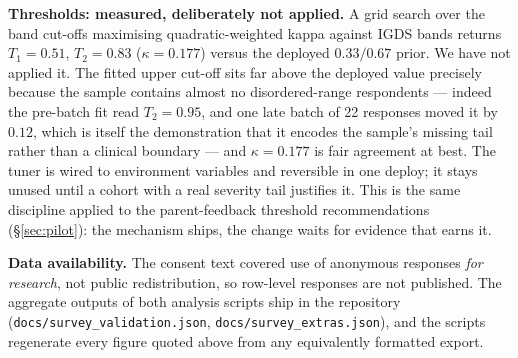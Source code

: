 \documentclass[11pt,a4paper]{article}
\begin{document}
\textbf{Thresholds: measured, deliberately not applied.} A grid search over the
band cut-offs maximising quadratic-weighted kappa against IGDS bands returns
$T_1{=}0.51$, $T_2{=}0.83$ ($\kappa = 0.177$) versus the deployed
$0.33 / 0.67$ prior. We have not applied it. The fitted upper cut-off sits far
above the deployed value precisely because the sample contains almost no
disordered-range respondents --- indeed the pre-batch fit read $T_2{=}0.95$,
and one late batch of 22 responses moved it by $0.12$, which is itself the
demonstration that it encodes the sample's missing tail rather than a
clinical boundary --- and $\kappa = 0.177$ is fair agreement at best. The tuner is wired to environment variables and reversible in one
deploy; it stays unused until a cohort with a real severity tail justifies it.
This is the same discipline applied to the parent-feedback threshold
recommendations (\S\ref{sec:pilot}): the mechanism ships, the change waits for
evidence that earns it.

\textbf{Data availability.} The consent text covered use of anonymous responses
\emph{for research}, not public redistribution, so row-level responses are not
published. The aggregate outputs of both analysis scripts ship in the repository
(\texttt{docs/survey\_validation.json}, \texttt{docs/survey\_extras.json}),
and the scripts regenerate every figure quoted above from any equivalently
formatted export.
\end{document}
